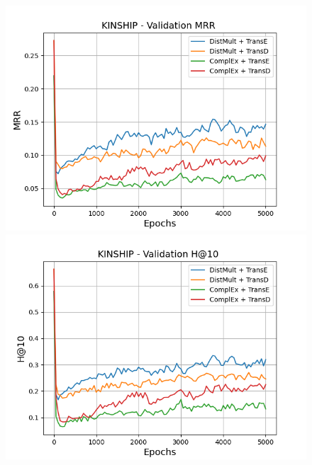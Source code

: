 \begin{figure}
    \centering
    \begin{minipage}{.5\textwidth}
      \centering
      \includegraphics[width=\linewidth]{figures/results/gan_train/pretrained/random/kinship/random_kinship_mrrs.png}
    \end{minipage}%
    \begin{minipage}{.5\textwidth}
      \centering
      \includegraphics[width=\linewidth]{figures/results/gan_train/pretrained/random/kinship/random_kinship_hit10.png}
    \end{minipage}
    

\end{figure}
